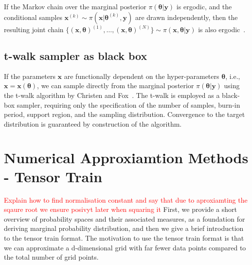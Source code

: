 If the Markov chain over the marginal posterior $\pi(\bm{\theta} |  \bm{y})$ is ergodic, and the conditional samples $\bm{x}^{(k)} \sim \pi(\bm{x}|   \bm{\theta}^{(k)}, \bm{y})$ are drawn independently, then the resulting joint chain $\{ (\bm{x}, \bm{\theta})^{(1)}, \dots, (\bm{x}, \bm{\theta})^{(N)} \} \sim \pi(\bm{x}, \bm{\theta} |  \bm{y})$ is also ergodic~\cite{acosta2014markov}.

\subsection{t-walk sampler as black box}
If the parameters $\bm{x}$ are functionally dependent on the hyper-parameters $\bm{\theta}$, i.e., $\bm{x} = \bm{x}(\bm{\theta})$, we can sample directly from the marginal posterior $\pi(\bm{\theta} | \bm{y})$ using the t-walk algorithm by Christen and Fox~\cite{christen2010general}. 
The t-walk is employed as a black-box sampler, requiring only the specification of the number of samples, burn-in period, support region, and the sampling distribution. 
Convergence to the target distribution is guaranteed by construction of the algorithm.

\section{Numerical Approxiamtion Methods - Tensor Train}
\label{sec:tensortrain}
\textcolor{red}{Explain how to find normalisation constant and say that due to aproxiamting the sqaure root we ensure posivyt later when squaring it}
First, we provide a short overview of probability spaces and their associated measures, as a foundation for deriving marginal probability distribution, and then we give a brief introduction to the tensor train format.
The motivation to use the tensor train format is that we can approximate a d-dimensional grid with far fewer data points compared to the total number of grid points.

